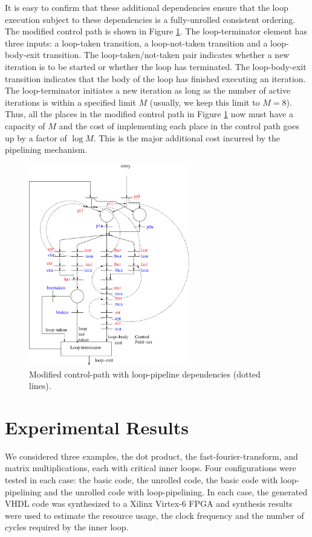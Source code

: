 \documentclass[conference]{IEEEtran}
\begin{document}
It is easy to confirm that these additional dependencies ensure
that the loop execution subject to these dependencies is a
fully-unrolled consistent ordering.  
The modified control path is shown in Figure \ref{fig:pipelinedCP}.
The loop-terminator element has three inputs:  a loop-taken transition,
a loop-not-taken transition and a loop-body-exit transition.  The loop-taken/not-taken
pair indicates whether a new iteration is to be started or whether the 
loop has terminated.  The loop-body-exit
transition indicates that the body of the loop has finished executing an
iteration.  The loop-terminator initiates a new iteration as long as the
number of active iterations is within a specified limit $M$ (usually, we keep
this limit to $M=8$).  Thus, all the places in the modified control path
in Figure \ref{fig:pipelinedCP} now must have a capacity of $M$ and the
cost of implementing each place in the control path goes up by a
factor of $\log M$.  This is the major additional cost incurred by
the pipelining mechanism.
\begin{figure}[ht]
  \centering
  \includegraphics[width=7cm]{pipelinedCP.eps}
  \caption{Modified control-path with loop-pipeline dependencies (dotted lines).}
  \label{fig:pipelinedCP}
\end{figure}

\section{Experimental Results}

We considered three examples, the dot product, the fast-fourier-transform,
and matrix multiplications, each with critical inner loops.  Four 
configurations were tested in each case: the basic code, the unrolled code,
the basic code with loop-pipelining and the unrolled code with loop-pipelining.
In each case, the generated VHDL code was synthesized to a Xilinx Virtex-6
FPGA and synthesis results were used to estimate the resource usage,
the clock frequency and the number of cycles required by the inner
loop.
\end{document}
